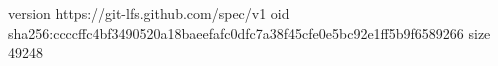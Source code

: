 version https://git-lfs.github.com/spec/v1
oid sha256:ccccffc4bf3490520a18baeefafc0dfc7a38f45cfe0e5bc92e1ff5b9f6589266
size 49248
